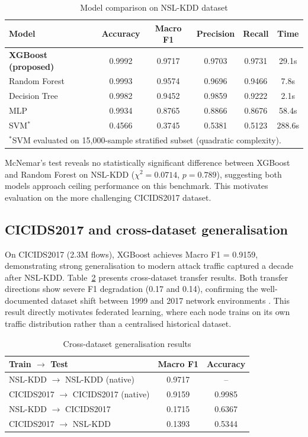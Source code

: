 \documentclass[review]{elsarticle}  %
\begin{document}
\begin{table}[h]
\centering
\caption{Model comparison on NSL-KDD dataset}
\label{tab:baseline}
\begin{tabular}{lccccc}
\hline
\textbf{Model} & \textbf{Accuracy} & \textbf{Macro F1} & \textbf{Precision} & \textbf{Recall} & \textbf{Time} \\
\hline
\textbf{XGBoost (proposed)} & 0.9992 & 0.9717 & 0.9703 & 0.9731 & 29.1s \\
Random Forest & 0.9993 & 0.9574 & 0.9696 & 0.9466 & 7.8s \\
Decision Tree & 0.9982 & 0.9452 & 0.9859 & 0.9222 & 2.1s \\
MLP & 0.9934 & 0.8765 & 0.8866 & 0.8676 & 58.4s \\
SVM$^*$ & 0.4566 & 0.3745 & 0.5381 & 0.5123 & 288.6s \\
\hline
\multicolumn{6}{l}{$^*$SVM evaluated on 15,000-sample stratified subset (quadratic complexity).}
\end{tabular}
\end{table}

McNemar's test reveals no statistically significant difference
between XGBoost and Random Forest on NSL-KDD
($\chi^2 = 0.0714$, $p = 0.789$), suggesting both models
approach ceiling performance on this benchmark. This motivates
evaluation on the more challenging CICIDS2017 dataset.

\subsection{CICIDS2017 and cross-dataset generalisation}

On CICIDS2017 (2.3M flows), XGBoost achieves Macro F1 = 0.9159,
demonstrating strong generalisation to modern attack traffic
captured a decade after NSL-KDD. Table~\ref{tab:cross_dataset}
presents cross-dataset transfer results. Both transfer directions
show severe F1 degradation (0.17 and 0.14), confirming the
well-documented dataset shift between 1999 and 2017 network
environments \cite{ref22}. This result directly motivates
federated learning, where each node trains on its own traffic
distribution rather than a centralised historical dataset.

\begin{table}[h]
\centering
\caption{Cross-dataset generalisation results}
\label{tab:cross_dataset}
\begin{tabular}{lcc}
\hline
\textbf{Train} $\rightarrow$ \textbf{Test} & \textbf{Macro F1} & \textbf{Accuracy} \\
\hline
NSL-KDD $\rightarrow$ NSL-KDD (native) & 0.9717 & -- \\
CICIDS2017 $\rightarrow$ CICIDS2017 (native) & 0.9159 & 0.9985 \\
NSL-KDD $\rightarrow$ CICIDS2017 & 0.1715 & 0.6367 \\
CICIDS2017 $\rightarrow$ NSL-KDD & 0.1393 & 0.5344 \\
\hline
\end{tabular}
\end{table}
\end{document}
